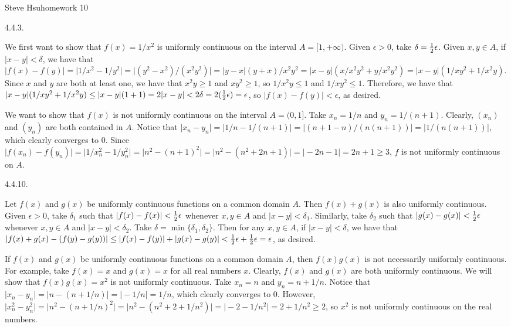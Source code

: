\def\abs#1{\vert#1\vert}
\centerline{Steve Hsu\hfill homework 10}
\item{4.4.3.}

We first want to show that $f(x) = 1/x^2$
is uniformly continuous on the interval $A = [1, +\infty)$.
Given $\epsilon > 0$, take $\delta = {1 \over 2} \epsilon$.
Given $x, y \in A$, if $\abs{x - y} < \delta$,
we have that $\abs{f(x) - f(y)} = \abs{1/x^2 - 1/y^2} =
\abs{(y^2 - x^2) / (x^2 y^2)} = \abs{y - x} (y + x) / x^2 y^2 =
\abs{x - y} (x / x^2 y^2 + y / x^2 y^2) = \abs{x - y} (1 / x y^2 + 1 / x^2 y)$.
Since $x$ and $y$ are both at least one,
we have that $x^2 y \ge 1$ and $x y^2 \ge 1$, so
$1 / x^2 y \le 1$ and $1 / x y^2 \le 1$.
Therefore, we have that $\abs{x - y} (1 / x y^2 + 1 / x^2 y) \le
\abs{x - y} (1 + 1) = 2\abs{x - y} < 2\delta = 2({1 \over 2} \epsilon) =
\epsilon$, so $\abs{f(x) - f(y)} < \epsilon$, as desired.

We want to show that $f(x)$ is not uniformly continuous
on the interval $A = (0,1]$.
Take $x_n = 1/n$ and $y_n = 1 / (n + 1)$.
Clearly, $(x_n)$ and $(y_n)$ are both contained in $A$.
Notice that $\abs{x_n - y_n} = \abs{1/n - 1/(n + 1)} =
\abs{(n + 1 - n) / (n(n + 1))} = \abs{1 / (n(n + 1))}$,
which clearly converges to $0$.
Since $\abs{f(x_n) - f(y_n)} = \abs{1/x_n^2 - 1/y_n^2} =
\abs{n^2 - (n + 1)^2} = \abs{n^2 - (n^2 + 2n + 1)} =
\abs{-2n - 1} = 2n + 1 \ge 3$,
$f$ is not uniformly continuous on $A$.
\bigskip
\item{4.4.10.}

Let $f(x)$ and $g(x)$ be uniformly continuous functions on a common domain $A$.
Then $f(x) + g(x)$ is also uniformly continuous.
Given $\epsilon > 0$, take $\delta _1$ such that
$\abs{f(x) - f(x)} < {1 \over 2} \epsilon$
whenever $x, y \in A$ and $\abs{x - y} < \delta _1$.
Similarly, take $\delta _2$ such that
$\abs{g(x) - g(x)} < {1 \over 2} \epsilon$
whenever $x, y \in A$ and $\abs{x - y} < \delta _2$.
Take $\delta = \min \{\delta _1, \delta _2\}$.
Then for any $x, y \in A$, if $\abs{x - y} < \delta$, we have that
$\abs{f(x) + g(x) - (f(y) - g(y))} \le \abs{f(x) - f(y)} + \abs{g(x) - g(y)} <
{1 \over 2} \epsilon + {1 \over 2} \epsilon = \epsilon$, as desired.

If $f(x)$ and $g(x)$ be uniformly continuous functions on a common domain $A$,
then $f(x) g(x)$ is not necessarily uniformly continuous.
For example, take $f(x) = x$ and $g(x) = x$ for all real numbers $x$.
Clearly, $f(x)$ and $g(x)$ are both uniformly continuous.
We will show that $f(x) g(x) = x^2$ is not uniformly continuous.
Take $x_n = n$ and $y_n = n + 1/n$.
Notice that $\abs{x_n - y_n} = \abs{n - (n + 1/n)} = \abs{-1/n} = 1/n$,
which clearly converges to $0$.
However, $\abs{x_n^2 - y_n^2} = \abs{n^2 - (n + 1/n)^2} =
\abs{n^2 - (n^2 + 2 + 1/n^2)} = \abs{-2 - 1/n^2} = 2 + 1/n^2 \ge 2$,
so $x^2$ is not uniformly continuous on the real numbers.

